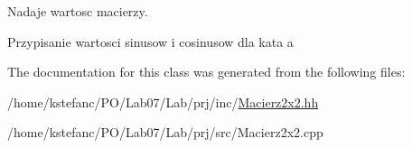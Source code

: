 Nadaje wartosc macierzy. 

Przypisanie wartosci sinusow i cosinusow dla kata a 

The documentation for this class was generated from the following files\+:\begin{DoxyCompactItemize}
\item 
/home/kstefanc/\+P\+O/\+Lab07/\+Lab/prj/inc/\hyperlink{_macierz2x2_8hh}{Macierz2x2.\+hh}\item 
/home/kstefanc/\+P\+O/\+Lab07/\+Lab/prj/src/Macierz2x2.\+cpp\end{DoxyCompactItemize}
